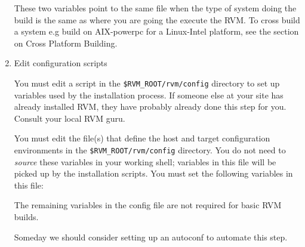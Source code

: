 \begin{enumerate}
These two variables point to the same file when the type of system  
doing the build is the same as where  you are going 
the execute the RVM. To cross build a system
e.g build on AIX-powerpc for a Linux-Intel platform, see the section on Cross
Platform Building.

\item Edit configuration scripts

You must edit a script in the {\tt \$RVM\_ROOT/rvm/config}  directory to set 
up variables used by the installation process.  
If someone else at your site has already installed RVM, they have
probably already done this step for you.  Consult your local RVM guru.

You must edit the file(s) that define the host and target configuration
environments in the {\tt \$RVM\_ROOT/rvm/config} directory.  
You do not need to {\em source} these variables in your working shell; 
variables in this file will be picked up by the installation scripts.  
You must set the following variables in this file:

The remaining variables in the config file are not required for basic RVM
builds.

Someday we should consider setting up an autoconf to automate this
step.


\end{enumerate}
